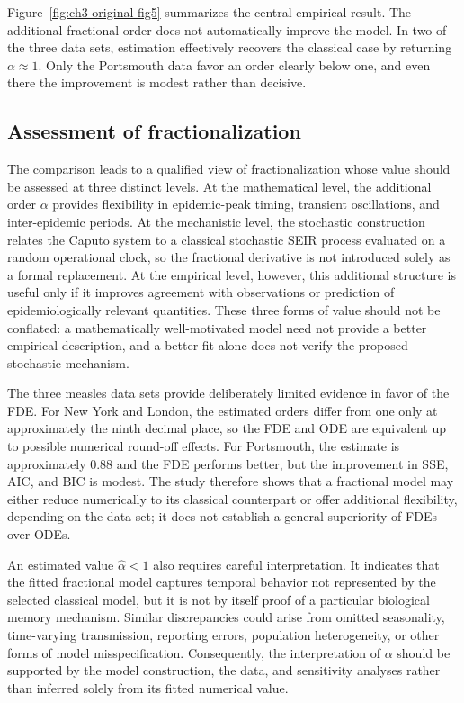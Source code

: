 \documentclass[00-main.tex]{subfiles}
\begin{document}
Figure~\ref{fig:ch3-original-fig5} summarizes the central empirical result.
The additional fractional order does not automatically improve the model.
In two of the three data sets, estimation effectively recovers the classical case by returning $\alpha\approx1$.
Only the Portsmouth data favor an order clearly below one, and even there the improvement is modest rather than decisive.


\subsection{Assessment of fractionalization}

The comparison leads to a qualified view of fractionalization whose value should be assessed at three distinct levels.
At the mathematical level, the additional order $\alpha$ provides flexibility in epidemic-peak timing, transient oscillations, and inter-epidemic periods.
At the mechanistic level, the stochastic construction relates the Caputo system to a classical stochastic SEIR process evaluated on a random operational clock, so the fractional derivative is not introduced solely as a formal replacement.
At the empirical level, however, this additional structure is useful only if it improves agreement with observations or prediction of epidemiologically relevant quantities.
These three forms of value should not be conflated: a mathematically well-motivated model need not provide a better empirical description, and a better fit alone does not verify the proposed stochastic mechanism.

The three measles data sets provide deliberately limited evidence in favor of the FDE.
For New York and London, the estimated orders differ from one only at approximately the ninth decimal place, so the FDE and ODE are equivalent up to possible numerical round-off effects.
For Portsmouth, the estimate is approximately $0.88$ and the FDE performs better, but the improvement in SSE, AIC, and BIC is modest.
The study therefore shows that a fractional model may either reduce numerically to its classical counterpart or offer additional flexibility, depending on the data set; it does not establish a general superiority of FDEs over ODEs.

An estimated value $\widehat{\alpha}<1$ also requires careful interpretation.
It indicates that the fitted fractional model captures temporal behavior not represented by the selected classical model, but it is not by itself proof of a particular biological memory mechanism.
Similar discrepancies could arise from omitted seasonality, time-varying transmission, reporting errors, population heterogeneity, or other forms of model misspecification.
Consequently, the interpretation of $\alpha$ should be supported by the model construction, the data, and sensitivity analyses rather than inferred solely from its fitted numerical value.
\end{document}
